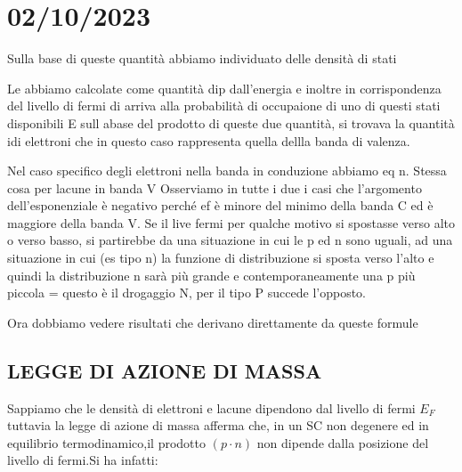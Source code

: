 \section*{02/10/2023}

\begin{center}
\end{center}


Sulla base di queste quantità abbiamo individuato delle densità di stati 

Le abbiamo calcolate come quantità dip dall'energia e inoltre in corrispondenza del livello di fermi di arriva alla probabilità di occupaione di uno di questi stati disponibili
E sull abase del prodotto di queste due quantità, si trovava la quantità idi elettroni che in questo caso rappresenta quella dellla banda di valenza.

Nel caso specifico degli elettroni nella banda in conduzione abbiamo eq n.
Stessa cosa per lacune in banda V
Osserviamo in tutte i due i casi che l'argomento dell'esponenziale è negativo perché ef è minore del minimo della banda C ed è maggiore della banda V.
Se il live fermi per qualche motivo si spostasse verso alto o verso basso, si partirebbe da una situazione in cui le p ed n sono uguali, ad una situazione in cui (es tipo n) la funzione di distribuzione si sposta verso l'alto e quindi la distribuzione n sarà più grande e contemporaneamente una p più piccola = questo è il drogaggio N, per il tipo P succede l'opposto.

Ora dobbiamo vedere risultati che derivano direttamente da queste formule

\subsection{LEGGE DI AZIONE DI MASSA}
Sappiamo che le densità di elettroni e lacune dipendono dal livello di fermi $E_F$ tuttavia
la legge di azione di massa afferma che, in un SC non degenere ed in equilibrio
termodinamico,il prodotto $(p\cdot n)$ non dipende dalla posizione del livello di fermi.Si ha infatti:

